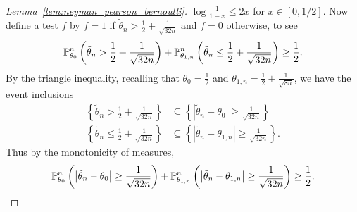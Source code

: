 \begin{proof}[Lemma~\ref{lem:neyman_pearson_bernoulli}]
  $\log \frac{1}{1-x} \leq 2x$
  for $x \in [0,1/2]$.
  Now define a test $f$ by
  $f = 1$ if $\tilde \theta_n > \frac{1}{2} + \frac{1}{\sqrt{32n}}$
  and $f=0$ otherwise,
  to see
  \begin{align*}
    \P_{\theta_0}^n \left(
      \tilde \theta_n > \frac{1}{2} + \frac{1}{\sqrt{32n}}
    \right)
    + \P_{\theta_{1,n}}^n \left(
      \tilde \theta_n \leq \frac{1}{2} + \frac{1}{\sqrt{32n}}
    \right)
    \geq \frac{1}{2}.
  \end{align*}
  By the triangle inequality,
  recalling that
  $\theta_0 = \frac{1}{2}$
  and $\theta_{1,n} = \frac{1}{2} + \frac{1}{\sqrt{8n}}$,
  we have the event inclusions
  \begin{align*}
    \left\{
    \tilde \theta_n > \frac{1}{2} + \frac{1}{\sqrt{32n}}
    \right\}
    &\subseteq
    \left\{
    \left| \tilde \theta_n - \theta_0 \right|
    \geq \frac{1}{\sqrt{32n}}
    \right\} \\
    \left\{
    \tilde \theta_n \leq \frac{1}{2} + \frac{1}{\sqrt{32n}}
    \right\}
    &\subseteq
    \left\{
    \left| \tilde \theta_n - \theta_{1,n} \right|
    \geq \frac{1}{\sqrt{32n}}
    \right\}.
  \end{align*}
  Thus by the monotonicity of measures,
  \begin{align*}
    \P_{\theta_0}^n \left(
      \big| \tilde \theta_n - \theta_0 \big|
      \geq \frac{1}{\sqrt{32n}}
    \right)
    + \P_{\theta_{1,n}}^n \left(
      \big| \tilde \theta_n - \theta_{1,n} \big|
      \geq \frac{1}{\sqrt{32n}}
    \right)
    \geq \frac{1}{2}.
  \end{align*}
\end{proof}

